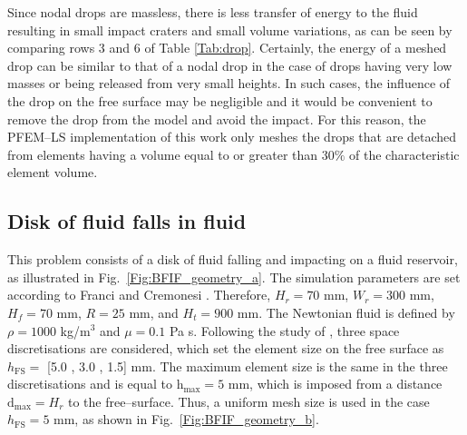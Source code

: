 \documentclass[final,3p,times]{elsarticle}
\newcommand{\EF}[1]{{\color{black}{#1}}}
\begin{document}
\EF{
Given that the mass and energy are computed in the finite element mesh, the system with a non-meshed drop presents less mass and energy at the beginning of the simulation than the system with a meshed drop. The difference in mass between systems is negligible and independent of the release height, but the difference in energy is increasingly different with the release height.} Since nodal drops are massless, there is less transfer of energy to the fluid resulting in small impact craters and small volume variations, as can be seen by comparing rows 3 and 6 of Table \ref{Tab:drop}. Certainly, the energy of a meshed drop can be similar to that of a nodal drop in the case of drops having very low masses or being released from very small heights. In such cases, the influence of the drop on the free surface may be negligible and it would be convenient to remove the drop from the model and avoid the impact. For this reason, the PFEM--LS implementation of this work only meshes the drops that are detached from elements having a volume equal to or greater than 30$\%$ of the characteristic element volume.  


\subsection{Disk of fluid falls in fluid}

This problem consists of a disk of fluid falling and impacting on a fluid reservoir, as illustrated in Fig.~\ref{Fig:BFIF_geometry_a}. The simulation parameters are set according to Franci and Cremonesi \citep{franci2017effect}. Therefore, $H_r = 70$ mm, $W_r = 300$ mm, $H_f = 70$ mm, $R = 25$ mm, and $H_t = 900$ mm. The Newtonian fluid is defined by $\rho = 1000$ kg/m$^3$ and $\mu = 0.1$ Pa s. Following the study of \citep{franci2017effect}, three space discretisations are considered, which set the element size on the free surface as $h_\mathrm{FS}=$ [5.0 , 3.0 , 1.5] mm. The maximum element size is the same in the three discretisations and is equal to $\mathrm{h}_\mathrm{max} = 5$ mm, which is imposed from a distance $\mathrm{d}_\mathrm{max} = H_r$ to the free--surface. Thus, a uniform mesh size is used in the case $h_\mathrm{FS}= 5$ mm, as shown in Fig.~\ref{Fig:BFIF_geometry_b}.
\end{document}
